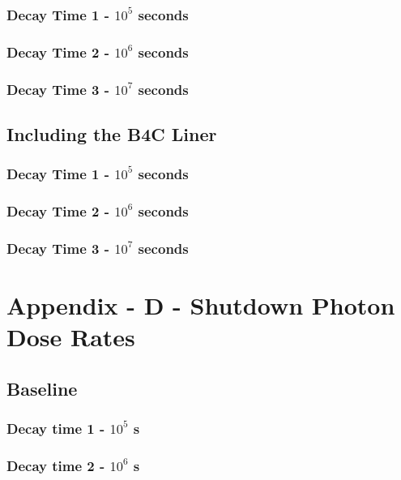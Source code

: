 \documentclass[12pt]{article}
\begin{document}
\subsubsection{Decay Time 1 - $10^{5}$ seconds}

\subsubsection{Decay Time 2 - $10^{6}$ seconds}

\subsubsection{Decay Time 3 - $10^{7}$ seconds}

\subsection{Including the B4C Liner}
\label{appendix:grp_photon_src_b4c}
\subsubsection{Decay Time 1 - $10^{5}$ seconds}

\subsubsection{Decay Time 2 - $10^{6}$ seconds}

\subsubsection{Decay Time 3 - $10^{7}$ seconds}


\section{Appendix - D - Shutdown Photon Dose Rates}
\subsection{Baseline}
\subsubsection{Decay time 1 - $10^5$ s}

\clearpage
\subsubsection{Decay time 2 - $10^6$ s}

\clearpage
\end{document}
